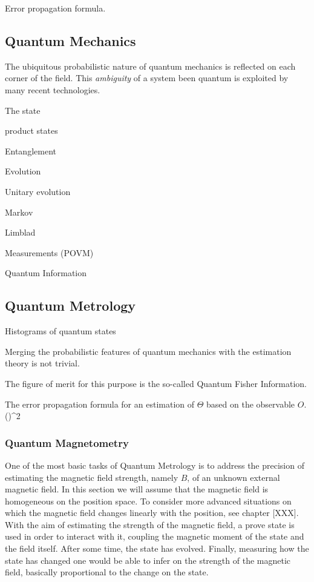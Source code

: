 Error propagation formula.

\subsection{Quantum Mechanics}
The ubiquitous probabilistic nature of quantum mechanics is reflected on each corner of the field.
This \emph{ambiguity} of a system been quantum is exploited by many recent technologies.

The state

product states

Entanglement

Evolution

Unitary evolution

Markov

Limblad

Measurements (POVM)

Quantum Information

\subsection{Quantum Metrology}

Histograms of quantum states

Merging the probabilistic features of quantum mechanics with the estimation theory is not trivial.

The figure of merit for this purpose is the so-called Quantum Fisher Information.

The error propagation formula for an estimation of $\Theta$ based on the observable $O$.
\be
  (\Delta \Theta)^2 \geq {}
\ee

\subsubsection{Quantum Magnetometry}
One of the most basic tasks of Quantum Metrology is to address the precision of estimating the magnetic field strength, namely $B$, of an unknown external magnetic field.
In this section we will assume that the magnetic field is homogeneous on the position space.
To consider more advanced situations on which the magnetic field changes linearly with the position, see chapter [XXX].
With the aim of estimating the strength of the magnetic field, a prove state is used in order to interact with it, coupling the magnetic moment of the state and the field itself.
After some time, the state has evolved.
Finally, measuring how the state has changed one would be able to infer on the strength of the magnetic field, basically proportional to the change on the state.

